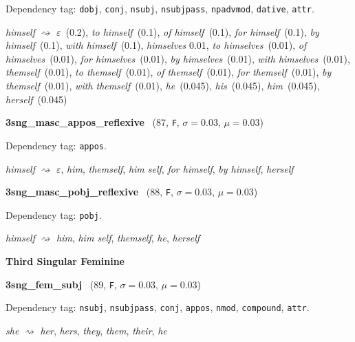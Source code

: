 \documentclass[11pt]{article}
\newenvironment{desc}{%
	\list{}{%
		\parsep 0.25em
		\topsep 0.25em
		\leftmargin 1em
		\rightmargin 0em
	}
	\item\relax
	\sloppy
}{%
	\endlist
}
\newcommand{\attr}[4]{%
	(#1, \texttt{#2}, $\sigma=#3$, $\mu=#4$)
}
\begin{document}
\begin{desc}
	Dependency tag:
	\texttt{dobj},
	\texttt{conj},
	\texttt{nsubj},
	\texttt{nsubjpass},
	\texttt{npadvmod},
	\texttt{dative},
	\texttt{attr}.

	\textit{himself}
	$\rightsquigarrow$
	\textit{$\varepsilon$}~(0.2),
	\textit{to himself}~(0.1),
	\textit{of himself}~(0.1),
	\textit{for himself}~(0.1),
	\textit{by himself}~(0.1),
	\textit{with himself}~(0.1),
	\textit{himselves} {0.01},
	\textit{to himselves}~(0.01),
	\textit{of himselves}~(0.01),
	\textit{for himselves}~(0.01),
	\textit{by himselves}~(0.01),
	\textit{with himselves}~(0.01),
	\textit{themself}~(0.01),
	\textit{to themself}~(0.01),
	\textit{of themself}~(0.01),
	\textit{for themself}~(0.01),
	\textit{by themself}~(0.01),
	\textit{with themself}~(0.01),
	\textit{he}~(0.045),
	\textit{his}~(0.045),
	\textit{him}~(0.045),
	\textit{herself}~(0.045)
\end{desc}

\noindent
\textbf{3sng\_masc\_appos\_reflexive}~\attr{87}{F}{0.03}{0.03}

\begin{desc}
	Dependency tag: \texttt{appos}.

	\textit{himself}
	$\rightsquigarrow$
	\textit{$\varepsilon$},
	\textit{him},
	\textit{themself},
	\textit{him self},
	\textit{for himself},
	\textit{by himself},
	\textit{herself}
\end{desc}

\noindent
\textbf{3sng\_masc\_pobj\_reflexive}~\attr{88}{F}{0.03}{0.03}

\begin{desc}
	Dependency tag: \texttt{pobj}.

	\textit{himself}
	$\rightsquigarrow$
	\textit{him},
	\textit{him self},
	\textit{themself},
	\textit{he},
	\textit{herself}
\end{desc}

\noindent
\textbf{Third Singular Feminine}

\noindent
\textbf{3sng\_fem\_subj}~\attr{89}{F}{0.03}{0.03}

\begin{desc}
	Dependency tag:
	\texttt{nsubj},
	\texttt{nsubjpass},
	\texttt{conj},
	\texttt{appos},
	\texttt{nmod},
	\texttt{compound},
	\texttt{attr}.

	\textit{she}
	$\rightsquigarrow$
	\textit{her},
	\textit{hers},
	\textit{they},
	\textit{them},
	\textit{their},
	\textit{he}
\end{desc}
\end{document}
